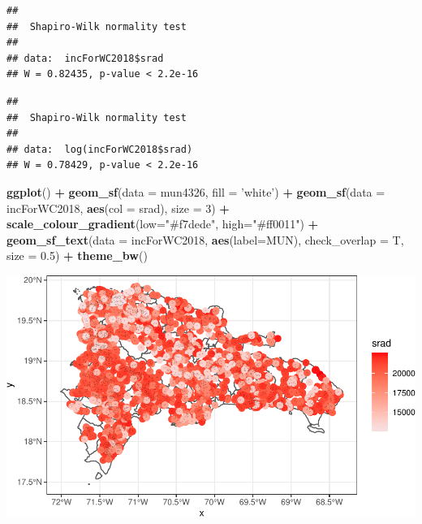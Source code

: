 \documentclass[11pt,]{article}
\newenvironment{Shaded}{\begin{snugshade}}{\end{snugshade}}
\newcommand{\KeywordTok}[1]{\textcolor[rgb]{0.13,0.29,0.53}{\textbf{#1}}}
\newcommand{\DataTypeTok}[1]{\textcolor[rgb]{0.13,0.29,0.53}{#1}}
\newcommand{\DecValTok}[1]{\textcolor[rgb]{0.00,0.00,0.81}{#1}}
\newcommand{\FloatTok}[1]{\textcolor[rgb]{0.00,0.00,0.81}{#1}}
\newcommand{\StringTok}[1]{\textcolor[rgb]{0.31,0.60,0.02}{#1}}
\newcommand{\OperatorTok}[1]{\textcolor[rgb]{0.81,0.36,0.00}{\textbf{#1}}}
\newcommand{\NormalTok}[1]{#1}
\begin{document}
\begin{verbatim}
## 
##  Shapiro-Wilk normality test
## 
## data:  incForWC2018$srad
## W = 0.82435, p-value < 2.2e-16
\end{verbatim}

\begin{Shaded}
\end{Shaded}

\begin{verbatim}
## 
##  Shapiro-Wilk normality test
## 
## data:  log(incForWC2018$srad)
## W = 0.78429, p-value < 2.2e-16
\end{verbatim}

\begin{Shaded}
\begin{Highlighting}[]
\KeywordTok{ggplot}\NormalTok{() }\OperatorTok{+}
\StringTok{  }\KeywordTok{geom_sf}\NormalTok{(}\DataTypeTok{data =}\NormalTok{ mun4326, }\DataTypeTok{fill =} \StringTok{'white'}\NormalTok{) }\OperatorTok{+}
\StringTok{  }\KeywordTok{geom_sf}\NormalTok{(}\DataTypeTok{data =}\NormalTok{ incForWC2018, }\KeywordTok{aes}\NormalTok{(}\DataTypeTok{col =}\NormalTok{ srad), }\DataTypeTok{size =} \DecValTok{3}\NormalTok{) }\OperatorTok{+}
\StringTok{  }\KeywordTok{scale_colour_gradient}\NormalTok{(}\DataTypeTok{low=}\StringTok{"#f7dede"}\NormalTok{, }\DataTypeTok{high=}\StringTok{"#ff0011"}\NormalTok{) }\OperatorTok{+}
\StringTok{  }\KeywordTok{geom_sf_text}\NormalTok{(}\DataTypeTok{data =}\NormalTok{ incForWC2018, }\KeywordTok{aes}\NormalTok{(}\DataTypeTok{label=}\NormalTok{MUN),}
               \DataTypeTok{check_overlap =}\NormalTok{ T, }\DataTypeTok{size =} \FloatTok{0.5}\NormalTok{) }\OperatorTok{+}
\StringTok{  }\KeywordTok{theme_bw}\NormalTok{()}
\end{Highlighting}
\end{Shaded}

\includegraphics{proyecto_files/figure-latex/unnamed-chunk-36-3.pdf}
\end{document}
